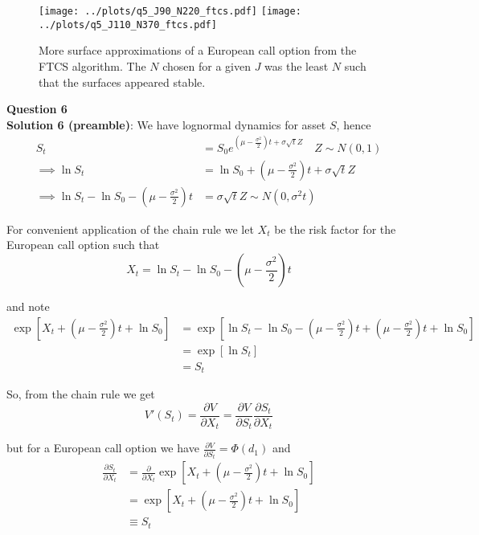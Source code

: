 \documentclass[12pt]{article}
\newlength\tindent
\renewcommand{\indent}{\hspace*{\tindent}}
\begin{document}
\begin{figure}[H]
	\centering
	\texttt{[image: ../plots/q5\_J90\_N220\_ftcs.pdf]}
	\texttt{[image: ../plots/q5\_J110\_N370\_ftcs.pdf]}
\caption{More surface approximations of a European call option from the FTCS algorithm. The $N$ chosen for a given $J$ was the least $N$ such that the surfaces appeared stable.}
\label{fig:surfaces_b}
\end{figure}


\newpage
{\bf\large Question 6} \\

{\bf Solution 6 (preamble)}: We have lognormal dynamics for asset $S$, hence
\begin{align*}
	S_t &= S_0 e^{(\mu - \frac{\sigma^2}{2})t + \sigma \sqrt{t} Z} \quad Z \sim N(0, 1) \\
	\implies \ln S_t &= \ln S_0 + \left( \mu - \frac{\sigma^2}{2} \right) t + \sigma \sqrt{t} Z \\
	\implies \ln S_t - \ln S_0 - \left( \mu - \frac{\sigma^2}{2} \right) t &= \sigma \sqrt{t} Z \sim N \left(0, \sigma^2t \right)
\end{align*}

\indent For convenient application of the chain rule we let $X_t$ be the risk factor for the European call option such that
\begin{equation*}
	X_t = \ln S_t - \ln S_0 - \left( \mu - \frac{\sigma^2}{2} \right) t
\end{equation*}

and note
\begin{align*}
	\exp \left[ X_t + (\mu - \frac{\sigma^2}{2})t + \ln S_0 \right] &= \exp \left[ \ln S_t - \ln S_0 - \left( \mu - \frac{\sigma^2}{2} \right) t  + (\mu - \frac{\sigma^2}{2})t + \ln S_0 \right] \\
	&= \exp \left[ \ln S_t \right] \\
	&= S_t
\end{align*}

So, from the chain rule we get
\begin{equation*}
	V'(S_t) = \frac{\partial V}{\partial X_t} = \frac{\partial V}{\partial S_t}\frac{\partial S_t}{\partial X_t}
\end{equation*}

but for a European call option we have $\frac{\partial V}{\partial S_t} = \Phi(d_1)$ and
\begin{align*}
	\frac{\partial S_t}{\partial X_t} &= \frac{\partial}{\partial X_t} \exp \left[ X_t + (\mu - \frac{\sigma^2}{2})t + \ln S_0 \right] \\
	&= \exp \left[ X_t + (\mu - \frac{\sigma^2}{2})t + \ln S_0 \right] \\
	&\equiv S_t
\end{align*}
\end{document}
